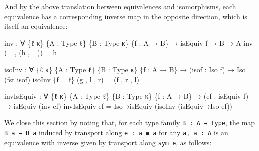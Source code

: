 \documentclass[
  11pt,
  oneside,
  article]{memoir}
\newenvironment{Shaded}{}{}
\newcommand{\NormalTok}[1]{#1}
\newcommand{\OtherTok}[1]{\textcolor[rgb]{0.00,0.44,0.13}{#1}}
\theoremstyle{definition}
\theoremstyle{plain}
\newcommand{\0}{\textsf{0}}
\newcommand{\1}{\tn{\textsf{1}}}
\begin{document}
And by the above translation between equivalences and isomorphisms, each
equivalence has a corresponding inverse map in the opposite direction,
which is itself an equivalence:

\begin{Shaded}
\begin{Highlighting}[]
\NormalTok{inv }\OtherTok{:} \OtherTok{∀} \OtherTok{\{}\NormalTok{ℓ κ}\OtherTok{\}} \OtherTok{\{}\NormalTok{A }\OtherTok{:}\NormalTok{ Type ℓ}\OtherTok{\}} \OtherTok{\{}\NormalTok{B }\OtherTok{:}\NormalTok{ Type κ}\OtherTok{\}} \OtherTok{\{}\NormalTok{f }\OtherTok{:}\NormalTok{ A }\OtherTok{→}\NormalTok{ B}\OtherTok{\}} \OtherTok{→}\NormalTok{ isEquiv f }\OtherTok{→}\NormalTok{ B }\OtherTok{→}\NormalTok{ A}
\NormalTok{inv }\OtherTok{(\_}\NormalTok{ , }\OtherTok{(}\NormalTok{h , }\OtherTok{\_))} \OtherTok{=}\NormalTok{ h}

\NormalTok{isoInv }\OtherTok{:} \OtherTok{∀} \OtherTok{\{}\NormalTok{ℓ κ}\OtherTok{\}} \OtherTok{\{}\NormalTok{A }\OtherTok{:}\NormalTok{ Type ℓ}\OtherTok{\}} \OtherTok{\{}\NormalTok{B }\OtherTok{:}\NormalTok{ Type κ}\OtherTok{\}} \OtherTok{\{}\NormalTok{f }\OtherTok{:}\NormalTok{ A }\OtherTok{→}\NormalTok{ B}\OtherTok{\}}
         \OtherTok{→} \OtherTok{(}\NormalTok{isof }\OtherTok{:}\NormalTok{ Iso f}\OtherTok{)} \OtherTok{→}\NormalTok{ Iso }\OtherTok{(}\NormalTok{fst isof}\OtherTok{)}
\NormalTok{isoInv }\OtherTok{\{}\NormalTok{f }\OtherTok{=}\NormalTok{ f}\OtherTok{\}} \OtherTok{(}\NormalTok{g , l , r}\OtherTok{)} \OtherTok{=} \OtherTok{(}\NormalTok{f , r , l}\OtherTok{)}

\NormalTok{invIsEquiv }\OtherTok{:} \OtherTok{∀} \OtherTok{\{}\NormalTok{ℓ κ}\OtherTok{\}} \OtherTok{\{}\NormalTok{A }\OtherTok{:}\NormalTok{ Type ℓ}\OtherTok{\}} \OtherTok{\{}\NormalTok{B }\OtherTok{:}\NormalTok{ Type κ}\OtherTok{\}} \OtherTok{\{}\NormalTok{f }\OtherTok{:}\NormalTok{ A }\OtherTok{→}\NormalTok{ B}\OtherTok{\}}
             \OtherTok{→} \OtherTok{(}\NormalTok{ef }\OtherTok{:}\NormalTok{ isEquiv f}\OtherTok{)} \OtherTok{→}\NormalTok{ isEquiv }\OtherTok{(}\NormalTok{inv ef}\OtherTok{)}
\NormalTok{invIsEquiv ef }\OtherTok{=}\NormalTok{ Iso→isEquiv }\OtherTok{(}\NormalTok{isoInv }\OtherTok{(}\NormalTok{isEquiv→Iso ef}\OtherTok{))}
\end{Highlighting}
\end{Shaded}

We close this section by noting that, for each type family
\texttt{B\ :\ A\ →\ Type}, the map
\texttt{B\ a\ →\ B\ a\textquotesingle{}} induced by transport along
\texttt{e\ :\ a\ ≡\ a\textquotesingle{}} for any
\texttt{a,\ a\textquotesingle{}\ :\ A} is an equivalence with inverse
given by transport along \texttt{sym\ e}, as follows:
\end{document}
